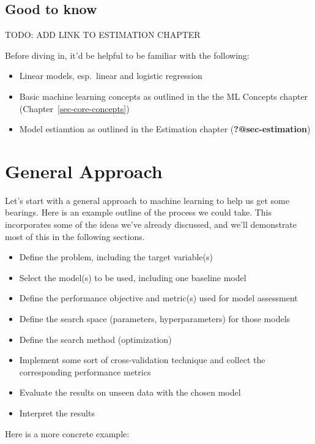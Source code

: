 \documentclass[
  letterpaper,
]{krantz}
\providecommand{\tightlist}{%
  \setlength{\itemsep}{0pt}\setlength{\parskip}{0pt}}\usepackage{longtable,booktabs,array}
\begin{document}
\subsection{Good to know}\label{good-to-know-1}

TODO: ADD LINK TO ESTIMATION CHAPTER

Before diving in, it'd be helpful to be familiar with the following:

\begin{itemize}
\tightlist
\item
  Linear models, esp.~linear and logistic regression
\item
  Basic machine learning concepts as outlined in the the ML Concepts
  chapter (Chapter~\ref{sec-core-concepts})
\item
  Model estiamtion as outlined in the Estimation chapter
  (\textbf{?@sec-estimation})
\end{itemize}

\section{General Approach}\label{general-approach}

Let's start with a general approach to machine learning to help us get
some bearings. Here is an example outline of the process we could take.
This incorporates some of the ideas we've already discussed, and we'll
demonstrate most of this in the following sections.

\begin{itemize}
\tightlist
\item
  Define the problem, including the target variable(s)
\item
  Select the model(s) to be used, including one baseline model
\item
  Define the performance objective and metric(s) used for model
  assessment
\item
  Define the search space (parameters, hyperparameters) for those models
\item
  Define the search method (optimization)
\item
  Implement some sort of cross-validation technique and collect the
  corresponding performance metrics
\item
  Evaluate the results on unseen data with the chosen model
\item
  Interpret the results
\end{itemize}

Here is a more concrete example:
\end{document}
